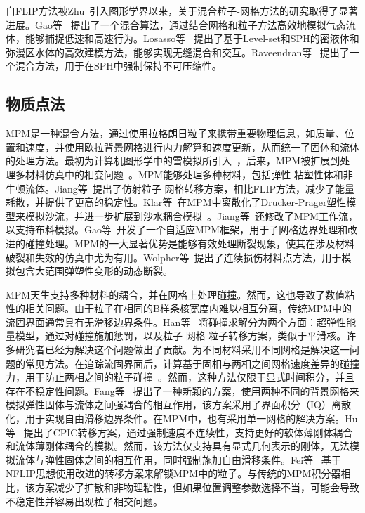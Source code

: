 自FLIP方法被Zhu~\cite{zhu2005animating}引入图形学界以来，关于混合粒子-网格方法的研究取得了显著进展。Gao等~\cite{gao2009simulating} 提出了一个混合算法，通过结合网格和粒子方法高效地模拟气态流体，能够捕捉低速和高速行为。Losasso等~\cite{losasso2008two} 提出了基于Level-set和SPH的密液体和弥漫区水体的高效建模方法，能够实现无缝混合和交互。Raveendran等~\cite{raveendran2011hybrid} 提出了一个混合方法，用于在SPH中强制保持不可压缩性。

\subsection{物质点法}
MPM是一种混合方法，通过使用拉格朗日粒子来携带重要物理信息，如质量、位置和速度，并使用欧拉背景网格进行内力解算和速度更新，从而统一了固体和流体的处理方法。最初为计算机图形学中的雪模拟所引入~\cite{stomakhin2013material}，后来，MPM被扩展到处理多材料仿真中的相变问题~\cite{stomakhin2014augmented}。MPM能够处理多种材料，包括弹性-粘塑性体和非牛顿流体。Jiang等~\cite{jiang2015affine}提出了仿射粒子-网格转移方案，相比FLIP方法，减少了能量耗散，并提供了更高的稳定性。Klar等~\cite{klar2016drucker}在MPM中离散化了Drucker-Prager塑性模型来模拟沙流，并进一步扩展到沙水耦合模拟~\cite{tampubolon2017multi}。Jiang等~\cite{jiang2017anisotropic}还修改了MPM工作流，以支持布料模拟。Gao等~\cite{gao2017adaptive}开发了一个自适应MPM框架，用于子网格边界处理和改进的碰撞处理。MPM的一大显著优势是能够有效处理断裂现象，使其在涉及材料破裂和失效的仿真中尤为有用。Wolpher等~\cite{wolper2019cd}提出了连续损伤材料点方法，用于模拟包含大范围弹塑性变形的动态断裂。

MPM天生支持多种材料的耦合，并在网格上处理碰撞。然而，这也导致了数值粘性的相关问题。由于粒子在相同的B样条核宽度内难以相互分离，传统MPM中的流固界面通常具有无滑移边界条件。Han等~\cite{han2019hybrid} 将碰撞求解分为两个方面：超弹性能量模型，通过对碰撞施加惩罚，以及粒子-网格-粒子转移方案，类似于平滑核。许多研究者已经为解决这个问题做出了贡献。为不同材料采用不同网格是解决这一问题的常见方法。在追踪流固界面后，计算基于固相与两相之间网格速度差异的碰撞力，用于防止两相之间的粒子碰撞~\cite{yan2018mpm,han2019hybrid}。然而，这种方法仅限于显式时间积分，并且存在不稳定性问题。Fang等~\cite{fang2020iq} 提出了一种新颖的方案，使用两种不同的背景网格来模拟弹性固体与流体之间强耦合的相互作用，该方案采用了界面积分（IQ）离散化，用于实现自由滑移边界条件。在MPM中，也有采用单一网格的解决方案。Hu等~\cite{hu2018moving} 提出了CPIC转移方案，通过强制速度不连续性，支持更好的软体薄刚体耦合和流体薄刚体耦合的模拟。然而，该方法仅支持具有显式几何表示的刚体，无法模拟流体与弹性固体之间的相互作用，同时强制施加自由滑移条件。Fei等~\cite{fei2021revisiting} 基于NFLIP思想使用改进的转移方案来解锁MPM中的粒子。与传统的MPM积分器相比，该方案减少了扩散和非物理粘性，但如果位置调整参数选择不当，可能会导致不稳定性并容易出现粒子相交问题。


